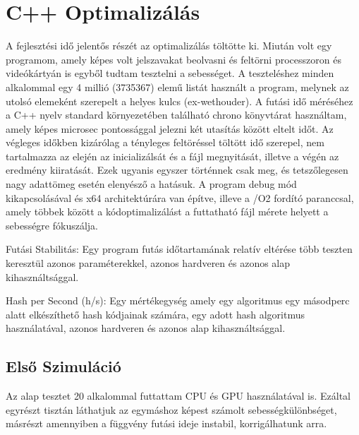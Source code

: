 \section{C++ Optimalizálás}


A fejlesztési idő jelentős részét az optimalizálás töltötte ki. Miután volt egy programom, amely képes volt jelszavakat beolvasni és feltörni processzoron és videókártyán is egyből tudtam tesztelni a sebességet. A teszteléshez minden alkalommal egy 4 millió (\num{3735367}) elemű listát használt a program, melynek az utolsó elemeként szerepelt a helyes kulcs (ex-wethouder).
A futási idő méréséhez a C++ nyelv standard környezetében található chrono könyvtárat használtam, amely képes microsec pontossággal jelezni két utasítás között eltelt időt. Az végleges időkben kizárólag a tényleges feltöréssel töltött idő szerepel, nem tartalmazza az elején az inicializálsát és a fájl megnyitását, illetve a végén az eredmény kiiratását. Ezek ugyanis egyszer történnek csak meg, és tetszőlegesen nagy adattömeg esetén elenyésző a hatásuk.
A program debug mód kikapcsolásával és x64 architektúrára van építve, illeve a /O2 fordító paranccsal, amely többek között a kódoptimalizálást a futtatható fájl mérete helyett a sebességre fókuszálja.


\begin{definition}
Futási Stabilitás: Egy program futás időtartamának relatív eltérése több teszten keresztül azonos paraméterekkel, azonos hardveren és azonos alap kihasználtsággal.
\end{definition}

\begin{definition}
Hash per Second (h/s): Egy mértékegység amely egy algoritmus egy másodperc alatt elkészíthető hash kódjainak számára, egy adott hash algoritmus használatával, azonos hardveren és azonos alap kihasználtsággal.
\end{definition}




\subsection{Első Szimuláció}


Az alap tesztet 20 alkalommal futtattam CPU és GPU használatával is. Ezáltal egyrészt tisztán láthatjuk az egymáshoz képest számolt sebességkülönbséget, másrészt amennyiben a függvény futási ideje instabil, korrigálhatunk arra.


